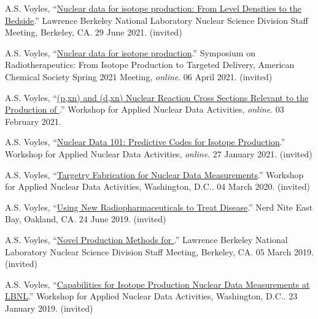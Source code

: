 \begin{bibsection}
\item A.S. Voyles, \enquote{\href{https://conferences.lbl.gov/event/541/}{Nuclear data for isotope production: From Level Densities to the Bedside}.} Lawrence Berkeley National Laboratory Nuclear Science Division Staff Meeting, Berkeley, CA. 29 June 2021. (invited)



\item A.S. Voyles, \enquote{\href{https://www.morressier.com/o/event/6022c0c2e8bb0500118660c6/article/609136b66e987178c2dc86ae}{Nuclear data for isotope production}.} Symposium on Radiotherapeutics: From Isotope Production to Targeted
Delivery, American Chemical Society Spring 2021 Meeting, \emph{online}. 06 April 2021. (invited)

\item A.S. Voyles, \enquote{\href{https://conferences.lbl.gov/event/504/}{(p,xn) and (d,xn)  Nuclear Reaction Cross Sections Relevant to the Production of }.} Workshop for Applied Nuclear Data Activities, \emph{online}. 03 February 2021.

\item A.S. Voyles, \enquote{\href{https://conferences.lbl.gov/event/504/}{Nuclear Data 101: Predictive Codes for Isotope Production}.} Workshop for Applied Nuclear Data Activities, \emph{online}. 27 January 2021. (invited)

\item A.S. Voyles, \enquote{\href{https://conferences.lbl.gov/event/292/}{Targetry Fabrication for Nuclear Data Measurements}.} Workshop for Applied Nuclear Data Activities, Washington, D.C.. 04 March 2020. (invited)

\item A.S. Voyles, \enquote{\href{https://eastbay.nerdnite.com/nerd-nite-624-apollo-11-recovery-oakland-art-deco-radiopharmaceuticals/}{Using New Radiopharmaceuticals to Treat Disease}.} Nerd Nite East Bay, Oakland, CA. 24 June 2019. (invited)

\item A.S. Voyles, \enquote{\href{https://conferences.lbl.gov/event/188/}{Novel Production Methods for }.} Lawrence Berkeley National Laboratory Nuclear Science Division Staff Meeting, Berkeley, CA. 05 March 2019. (invited)

\item A.S. Voyles, \enquote{\href{https://conferences.lbl.gov/event/198/}{Capabilities for Isotope Production Nuclear Data Measurements at LBNL}.} Workshop for Applied Nuclear Data Activities, Washington, D.C.. 23 January 2019. (invited)


\end{bibsection}
